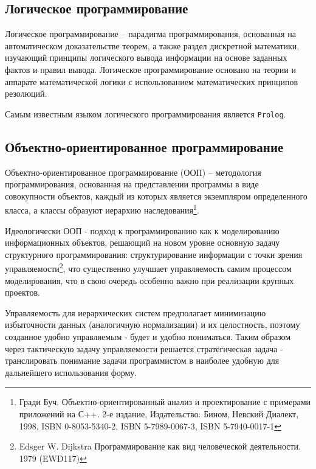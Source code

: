 \documentclass[12pt, twoside]{report}
\begin{document}
\subsection*{Логическое программирование}

Логическое программирование -- парадигма программирования, основанная на автоматическом доказательстве теорем, а также раздел дискретной математики, изучающий принципы логического вывода информации на основе заданных фактов и правил вывода. Логическое программирование основано на теории и аппарате математической логики с использованием математических принципов резолюций.

Самым известным языком логического программирования является \texttt{Prolog}.

\subsection*{Объектно-ориентированное программирование}

Объектно-ориентированное программирование (ООП) -- методология программирования, основанная на представлении программы в виде совокупности объектов, каждый из которых является экземпляром определенного класса, а классы образуют иерархию наследования\footnote{Гради Буч. Объектно-ориентированный анализ и проектирование с примерами приложений на С++. 2-е издание, Издательство: Бином, Невский Диалект, 1998, ISBN 0-8053-5340-2, ISBN 5-7989-0067-3, ISBN 5-7940-0017-1}.

Идеологически ООП - подход к программированию как к моделированию информационных объектов, решающий на новом уровне основную задачу структурного программирования: структурирование информации с точки зрения управляемости\footnote{Edsger W. Dijkstra Программирование как вид человеческой деятельности. 1979 (EWD117)}, что существенно улучшает управляемость самим процессом моделирования, что в свою очередь особенно важно при реализации крупных проектов.

Управляемость для иерархических систем предполагает минимизацию избыточности данных (аналогичную нормализации) и их целостность, поэтому созданное удобно управляемым - будет и удобно пониматься. Таким образом через тактическую задачу управляемости решается стратегическая задача - транслировать понимание задачи программистом в наиболее удобную для дальнейшего использования форму.
\end{document}
